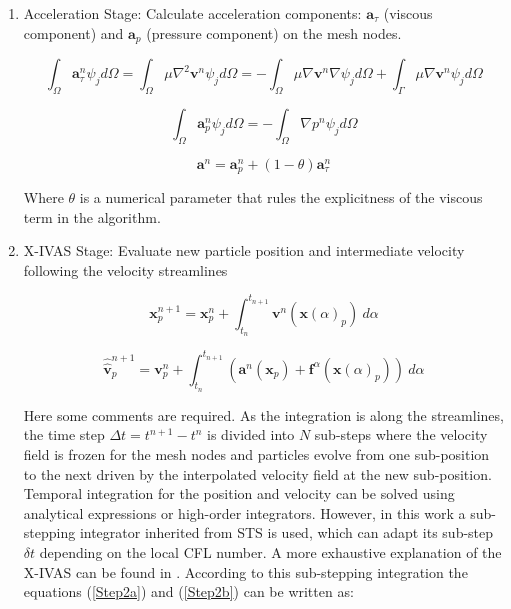\begin{enumerate}
  \item Acceleration Stage: Calculate acceleration components: $\mathbf{a}_{\tau}$ (viscous component) and $\mathbf{a}_{p}$ (pressure component) on the mesh nodes.


  \begin{equation}\label{Step1a}
\int_{\Omega}\mathbf{a}^{n}_{\tau}\psi_j d\Omega=\int_{\Omega}\mu \nabla^{2}\mathbf{v}^{n} \psi_j d\Omega=-\int_{\Omega}\mu \nabla\mathbf{v}^{n} \nabla \psi_j d\Omega + \int_{\Gamma}\mu \nabla\mathbf{v}^{n} \psi_j d\Omega
\end{equation}

\begin{equation}\label{Step1b}
\int_{\Omega}\mathbf{a}^{n}_{p}\psi_j d\Omega=-\int_{\Omega}\nabla p^{n} \psi_j d\Omega
\end{equation}

\begin{equation}\label{Step1c}
\mathbf{a}^{n}=\mathbf{a}^{n}_{p} + (1-\theta)\mathbf{a}^{n}_{\tau}
\end{equation}

Where $\theta$ is a numerical parameter that rules the explicitness of the viscous term in the algorithm.

  \item X-IVAS Stage: Evaluate new particle position and intermediate velocity following the velocity streamlines

  \begin{equation}\label{Step2a}
\mathbf{x}^{n+1}_{p}=\mathbf{x}^{n}_{p} + \int_{t_n}^{t_{n+1}} \mathbf{v}^{n}(\mathbf{x}(\alpha)_{p}) \ d\alpha
\end{equation}

\begin{equation}\label{Step2b}
\displaystyle \widehat{\widehat{\mathbf{v}}}^{n+1}_{p}=\mathbf{v}^{n}_{p} + 
\int_{t_n}^{t_{n+1}} \left( \mathbf{a}^{n}(\mathbf{x}_{p}) + \mathbf{f}^{\alpha} (\mathbf{x}(\alpha)_{p}) \right) 
 \ d\alpha
\end{equation}

Here some comments are required. As the integration is along the streamlines, the time step $\Delta t=t^{n+1}-t^{n}$ is divided into $N$ sub-steps where the velocity field is frozen for the mesh nodes and particles evolve from one sub-position to the next driven by the interpolated velocity field at the new sub-position. Temporal integration for the position and velocity can be solved using analytical expressions\cite{Nigro11} or high-order integrators\cite{Nair2003275}. However, in this work a sub-stepping integrator inherited from STS\cite{Alexiades96} is used, which can adapt its sub-step $\delta t$ depending on the local CFL number. A more exhaustive explanation of the X-IVAS can be found in \cite{Nigro11}. According to this sub-stepping integration the equations (\ref{Step2a}) and (\ref{Step2b}) can be written as:


\end{enumerate}
